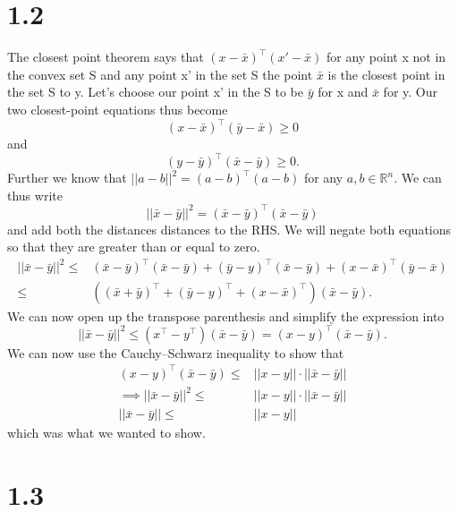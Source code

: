 \documentclass{article}
\begin{document}
\section*{1.2}
	The closest point theorem says that $(x-\bar{x})^\top (x'-\bar{x})$ for any point x not in the convex set S and any point x' in the set S the point $\bar{x}$ is the closest point in the set S to y.
	Let's choose our point x' in the S to be $\bar{y}$ for x and $\bar{x}$ for y. Our two closest-point equations thus become
	\begin{equation}
		(x-\bar{x})^\top(\bar{y} - \bar{x}) \geq 0
	\end{equation}
	and
	\begin{equation}
		(y-\bar{y})^\top(\bar{x} - \bar{y}) \geq 0. \label{eq:y_dist}
	\end{equation}
	Further we know that $||a-b||^2 = (a - b)^\top(a-b)$ for any $a,b\in \mathbb{R}^n$.
	We can thus write
	\begin{equation} 
		||\bar{x} - \bar{y}||^2 = (\bar{x} - \bar{y})^\top(\bar{x}-\bar{y}) 
	\end{equation}
	and add both the distances distances to the RHS. We will negate both equations so that they are greater than or equal to zero.
	\begin{align}
		||\bar{x} - \bar{y}||^2 \leq & (\bar{x} - \bar{y})^\top(\bar{x}-\bar{y}) + (\bar{y} - y)^\top(\bar{x} - \bar{y}) + (x-\bar{x})^\top(\bar{y} - \bar{x}) \\
		\leq & ((\bar{x} + \bar{y})^\top + (\bar{y} - y)^\top + (x-\bar{x})^\top)(\bar{x} - \bar{y}).
	\end{align}
	We can now open up the transpose parenthesis and simplify the expression into
	\begin{equation}
		||\bar{x} - \bar{y}||^2 \leq (x^\top - y^\top)(\bar{x}-\bar{y}) = (x - y)^\top(\bar{x}-\bar{y}).
	\end{equation}
	We can now use the Cauchy–Schwarz inequality to show that
	 \begin{align}
	 	 (x - y)^\top(\bar{x}-\bar{y}) \leq &  ||x-y||\cdot||\bar{x}-\bar{y}||\\ 
	 	 \implies ||\bar{x} - \bar{y}||^2 \leq & ||x-y||\cdot||\bar{x}-\bar{y}|| \\
	 	||\bar{x} - \bar{y}|| \leq & ||x-y||
	 \end{align}
 	which was what we wanted to show.
\section*{1.3}
\end{document}
